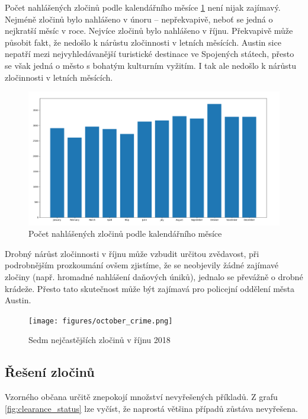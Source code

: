 \documentclass{article}
\begin{document}
Počet nahlášených zločinů podle kalendářního měsíce \ref{fig:crime_per_each_month} není
nijak zajímavý. Nejméně zločinů bylo nahlášeno v únoru -- nepřekvapivě, neboť se jedná
o nejkratší měsíc v roce. Nejvíce zločinů bylo nahlášeno v říjnu. Překvapivě může působit
fakt, že nedošlo k nárůstu zločinnosti v letních měsících. Austin sice nepatří mezi
nejvyhledávanější turistické destinace ve Spojených státech, přesto se však jedná o město
s bohatým kulturním vyžitím. I tak ale nedošlo k nárůstu zločinnosti v letních měsících.

\begin{figure}
  \centering
  \includegraphics[width=1.4\textwidth]{figures/crime_per_each_month.png}
  \caption{Počet nahlášených zločinů podle kalendářního měsíce}
  \label{fig:crime_per_each_month}
\end{figure}

Drobný nárůst zločinnosti v říjnu může vzbudit určitou zvědavost, při podrobnějším prozkoumání
ovšem zjistíme, že se neobjevily žádné zajímavé zločiny (např. hromadné nahlášení daňových úniků),
jednalo se převážně o drobné krádeže. Přesto tato skutečnost může být zajímavá pro policejní
oddělení města Austin.

\begin{figure}
  \centering
  \texttt{[image: figures/october\_crime.png]}
  \caption{Sedm nejčastějších zločinů v říjnu 2018}
  \label{fig:october_crime}
\end{figure}

\subsection{Řešení zločinů}

Vzorného občana určitě znepokojí množství nevyřešených příkladů. Z grafu \ref{fig:clearance_status}
lze vyčíst, že naprostá většina případů zůstáva nevyřešena.
\end{document}
